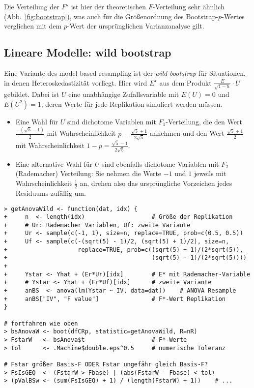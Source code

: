 Die Verteilung der $F^{\star}$ ist hier der theoretischen $F$-Verteilung sehr ähnlich (Abb.\ \ref{fig:bootstrap}), was auch für die Größenordnung des Bootstrap-$p$-Wertes verglichen mit dem $p$-Wert der ursprünglichen Varianzanalyse gilt.

\subsection{Lineare Modelle: wild bootstrap}
\label{sec:bootWild}

Eine Variante des model-based resampling ist der \emph{wild bootstrap} für Situationen, in denen Heteroskedastizität vorliegt. Hier wird $E^{\star}$ aus dem Produkt $\frac{E}{\sqrt{1-h}} \cdot U$ gebildet. Dabei ist $U$ eine unabhängige Zufallsvariable mit $E(U) = 0$ und $E(U^{2}) = 1$, deren Werte für jede Replikation simuliert werden müssen.
\begin{itemize}
\item Eine Wahl für $U$ sind dichotome Variablen mit $F_{1}$-Verteilung, die den Wert $\frac{-(\sqrt{5}-1)}{2}$ mit Wahrscheinlichkeit $p = \frac{\sqrt{5}+1}{2 \sqrt{5}}$ annehmen und den Wert $\frac{\sqrt{5}+1}{2}$ mit Wahrscheinlichkeit $1 - p = \frac{\sqrt{5}-1}{2 \sqrt{5}}$.
\item Eine alternative Wahl für $U$ sind ebenfalls dichotome Variablen mit $F_{2}$ (Rademacher) Verteilung: Sie nehmen die Werte $-1$ und $1$ jeweils mit Wahrscheinlichkeit $\frac{1}{2}$ an, drehen also das ursprüngliche Vorzeichen jedes Residuums zufällig um.
\end{itemize}
\begin{lstlisting}
> getAnovaWild <- function(dat, idx) {
+     n  <- length(idx)                   # Größe der Replikation
+     # Ur: Rademacher Variablen, Uf: zweite Variante
+     Ur <- sample(c(-1, 1), size=n, replace=TRUE, prob=c(0.5, 0.5))
+     Uf <- sample(c(-(sqrt(5) - 1)/2, (sqrt(5) + 1)/2), size=n,
+                    replace=TRUE, prob=c((sqrt(5) + 1)/(2*sqrt(5)),
+                                         (sqrt(5) - 1)/(2*sqrt(5))))
+
+     Ystar <- Yhat + (Er*Ur)[idx]        # E* mit Rademacher-Variable
+     # Ystar <- Yhat + (Er*Uf)[idx]      # zweite Variante
+     anBS  <- anova(lm(Ystar ~ IV, data=dat))    # ANOVA Resample
+     anBS["IV", "F value"]               # F*-Wert Replikation
}

# fortfahren wie oben
> bsAnovaW <- boot(dfCRp, statistic=getAnovaWild, R=nR)
> FstarW   <- bsAnova$t                   # F*-Werte
> tol      <- .Machine$double.eps^0.5     # numerische Toleranz

# Fstar größer Basis-F ODER Fstar ungefähr gleich Basis-F?
> FsIsGEQ  <- (FstarW > Fbase) | (abs(FstarW - Fbase) < tol)
> (pValBSw <- (sum(FsIsGEQ) + 1) / (length(FstarW) + 1))    # ...
\end{lstlisting}

